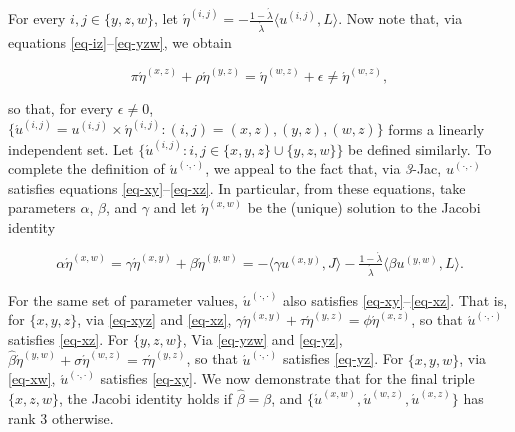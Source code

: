 \documentclass[12pt,a4paper,twoside]{article}
\renewcommand{\ij}{{(i, j)}}
\newcommand{\xy}{{(x, y)}}
\newcommand{\yz}{{(y,z)}}
\newcommand{\xz}{{(x,z)}}
\newcommand{\xw}{{(x,w)}}
\newcommand{\yw}{{(y,w)}}
\newcommand{\wz}{(w,z)}
\newcommand{\dd}{{(\cdot,\cdot)}}
\newcommand{\threejac}{\textup{\textit{3}-Jac}}
\begin{document}
\begin{appendices}
For every $i,j \in \{y,z,w\}$, let
$\acute{\eta}^{\ij} = - \frac{1 - \acute{\lambda}}{\acute{\lambda}} \langle
u^{\ij}, L \rangle$.  Now note that, via equations
\eqref{eq-iz}--\eqref{eq-yzw}, we obtain
\begin{linenomath*}
  \begin{equation}\label{eq-3d-epsilon}
    \pi  \acute{\eta}^{\xz} + \rho  \acute{\eta}^{\yz} = \acute{\eta}^{\wz} + \epsilon \neq
    \acute{\eta}^{\wz},
  \end{equation}
\end{linenomath*}
so that, for every $\epsilon\neq 0$,
$\{\acute{u}^{\ij} = u^{\ij} \times \acute{\eta}^{\ij}: \ij = \xz, \yz, \wz\}$
forms a linearly independent set. Let
$\{\acute{u}^{\ij}: i,j \in \{x,y,z\}\cup \{y,z,w\}\}$ be defined similarly. To
complete the definition of $\acute{u}^{\dd}$, we appeal to the fact that, via
\threejac, $u^{\dd}$ satisfies equations \eqref{eq-xy}--\eqref{eq-xz}. In
particular, from these equations, take parameters $\alpha$, $\beta$, and $\gamma$
and let $\acute{\eta}^{\xw}$ be the (unique) solution to the Jacobi identity
\begin{linenomath*}
  \begin{equation}\label{eq-xw}
    \alpha  \acute{\eta}^{\xw} =  \gamma  \acute{\eta}^{\xy} + \beta \acute{\eta}^{\yw} =
    -\langle \gamma  u^{\xy} , J \rangle -
    \tfrac{1-\acute{\lambda}}{\acute{\lambda}}\langle\beta u^{\yw}, L  \rangle.
  \end{equation}
\end{linenomath*}
For the same set of parameter values, $\acute{u}^{\dd}$ also satisfies
\eqref{eq-xy}--\eqref{eq-xz}. That is, for $\{x,y,z\}$, via \cref{eq-xyz} and \eqref{eq-xz},
$\gamma \acute{\eta}^{\xy}+\tau \acute{\eta}^{\yz} = \phi \acute{\eta}^{\xz}$,
so that $\acute{u}^{\dd}$ satisfies \eqref{eq-xz}. For $\{y,z,w\}$, Via \cref{eq-yzw} and
\eqref{eq-yz},
$\hat{\beta} \acute{\eta}^{\yw}+\sigma \acute{\eta}^{\wz} = \tau
\acute{\eta}^{\yz}$, so that $\acute{u}^{\dd}$ satisfies \eqref{eq-yz}. For $\{x,y,w\}$,
via \cref{eq-xw}, $\acute{u}^{\dd}$ satisfies \eqref{eq-xy}.  We now demonstrate
that for the final triple $\{x,z,w\}$,  the Jacobi identity holds if
$\hat{\beta} = \beta$, and  $\{\acute{u}^{\xw},\acute{u}^{\wz},\acute{u}^{\xz}\}$
has rank $3$ otherwise.


\end{appendices}
\end{document}
